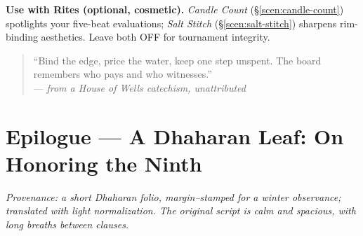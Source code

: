 \documentclass[11pt]{article}
\numberwithin{equation}{section} %
\theoremstyle{plain} %
\theoremstyle{definition} %
\theoremstyle{remark} %
\begin{document}
\medskip
\noindent\textbf{Use with Rites (optional, cosmetic).} \emph{Candle Count} (\S\ref{scen:candle-count}) spotlights your five-beat evaluations; \emph{Salt Stitch} (\S\ref{scen:salt-stitch}) sharpens rim-binding aesthetics. Leave both \textsc{OFF} for tournament integrity.

\medskip
\begin{quote}\small
“Bind the edge, price the water, keep one step unspent. The board remembers who pays and who witnesses.”\\
\hfill — \textit{from a House of Wells catechism, unattributed}
\end{quote}



\section*{Epilogue — A Dhaharan Leaf: On Honoring the Ninth}
\label{epilogue:dhahara-ninth}
{}

\noindent\textit{Provenance: a short Dhaharan folio, margin–stamped for a winter observance; translated with light normalization. The original script is calm and spacious, with long breaths between clauses.}
\end{document}
